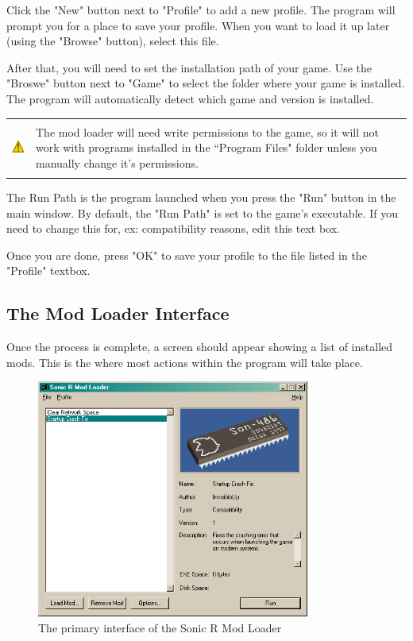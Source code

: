 \documentclass[12pt,a4paper,notitlepage]{article}
\newcommand{\warning}[1]{
	\begin{tabular}{ m{1.1cm}  m{11cm} }
	&\\
	\includegraphics[width=1.1cm, height=1.1cm]{warning} & #1
	\\&\\
	\end{tabular}
}
\begin{document}
Click the "New" button next to "Profile" to add a new profile. The program will prompt you for a place to save your profile. When you want to load it up later (using the "Browse" button), select this file.

After that, you will need to set the installation path of your game. Use the "Broswe" button next to "Game" to select the folder where your game is installed. The program will automatically detect which game and version is installed.

\warning{The mod loader will need write permissions to the game, so it will not work with programs installed in the ``Program Files" folder unless you manually change it's permissions.}

The Run Path is the program launched when you press the "Run" button in the main window. By default, the "Run Path" is set to the game's executable.  If you need to change this for, ex: compatibility reasons, edit this text box.

Once you are done, press "OK" to save your profile to the file listed in the "Profile" textbox.

\subsection{The Mod Loader Interface}
\label{subsec:using-interface}
Once the process is complete, a screen should appear showing a list of installed mods. This is the where most actions within the program will take place.

\begin{figure}[h]
	\centering
	\includegraphics[width=0.8\textwidth]{interface-3.png}
	\caption{The primary interface of the Sonic R Mod Loader}
	\label{fig:interface}
\end{figure}
\end{document}
